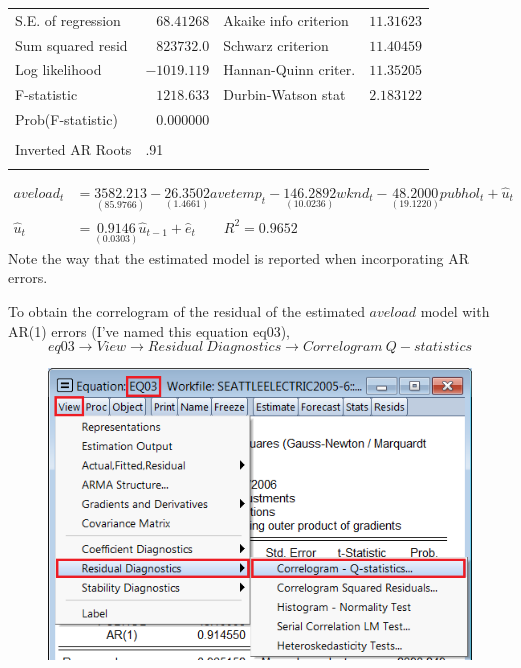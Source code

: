 \documentclass[12pt]{report}
\begin{document}
\begin{table}[H]
\begin{tabular}{lrrrr}
		\multicolumn{1}{l}{S.E. of regression}&\multicolumn{1}{r}{$68.41268$}&\multicolumn{2}{l}{Akaike info criterion}&\multicolumn{1}{r}{$11.31623$}\\
		\multicolumn{1}{l}{Sum squared resid}&\multicolumn{1}{r}{$823732.0$}&\multicolumn{2}{l}{Schwarz criterion}&\multicolumn{1}{r}{$11.40459$}\\
		\multicolumn{1}{l}{Log likelihood}&\multicolumn{1}{r}{$-1019.119$}&\multicolumn{2}{l}{Hannan-Quinn criter.}&\multicolumn{1}{r}{$11.35205$}\\
		\multicolumn{1}{l}{F-statistic}&\multicolumn{1}{r}{$1218.633$}&\multicolumn{2}{l}{Durbin-Watson stat}&\multicolumn{1}{r}{$2.183122$}\\
		\multicolumn{1}{l}{Prob(F-statistic)}&\multicolumn{1}{r}{$0.000000$}&\multicolumn{1}{c}{}&\multicolumn{1}{c}{}&\multicolumn{1}{c}{}\\
		[4.5pt] \hline \\ [-4.5pt]
		\multicolumn{1}{l}{Inverted AR Roots}&\multicolumn{1}{l}{.91}&\multicolumn{1}{c}{}&\multicolumn{1}{c}{}&\multicolumn{1}{c}{}\\
		[4.5pt] \hline \\ [-4.5pt]
	\end{tabular}
	\begin{align*}
	{aveload}_t &= \underset{(85.9766)}{3582.213} - \underset{(1.4661)}{26.3502}avetemp_t - \underset{(10.0236)}{146.2892}wknd_t - \underset{(19.1220)}{48.2000}pubhol_t  + \hat{u}_t \\
	\hat{u}_t &= \underset{(0.0303)}{0.9146}\hat{u}_{t-1} + \hat{e}_t \qquad R^2 = 0.9652
	\end{align*} \noindent Note the way that the estimated model is reported when incorporating AR errors.
\end{table} \vspace{-\baselineskip} \noindent To obtain the correlogram of the residual of the estimated $aveload$ model with AR(1) errors (I've named this equation eq03), $$eq03 \to View \to Residual\ Diagnostics \to Correlogram\ Q-statistics$$ \begin{figure}[H]
\centerline{\includegraphics{tute10_13}}
\end{figure}
\end{document}
